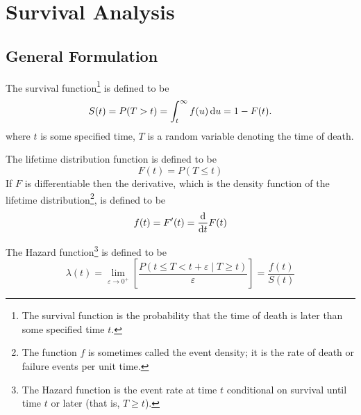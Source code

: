 \chapter{Survival Analysis}

\section{General Formulation}

\begin{definition}
	The survival function\footnote{The survival function is the probability that the time of death is later than some specified time $t$.} is defined to be
	\begin{equation}
		S(t)=P(T>t)=\int_{t}^{\infty}f(u)\mathop{}\!\mathrm{d} u=1-F(t) .
	\end{equation}
	where $t$ is some specified time, $T$ is a random variable denoting the time of death.
\end{definition}

\begin{definition}
	The lifetime distribution function is defined to be
	\begin{equation}
		F(t)=P(T\leq t)
	\end{equation}
	If $F$ is differentiable then the derivative, which is the density function of the lifetime distribution\footnote{The function $f$ is sometimes called the event density; it is the rate of death or failure events per unit time.}, is defined to be
	\begin{equation}
		f(t)=F^{\prime}(t)=\frac{\mathop{}\!\mathrm{d}}{\mathop{}\!\mathrm{d} t}F(t)
	\end{equation}
\end{definition}

\begin{definition}
	The Hazard function\footnote{The Hazard function is the event rate at time $t$ conditional on survival until time $t$ or later (that is, $T\geq t$).} is defined to be
	\begin{equation}
		\lambda(t)=\lim_{\varepsilon\rightarrow 0^{+}}\left[\frac{P(t\leq T<t+\varepsilon\mid T\geq t)}{\varepsilon}\right]=\frac{f(t)}{S(t)}
	\end{equation}
\end{definition}


